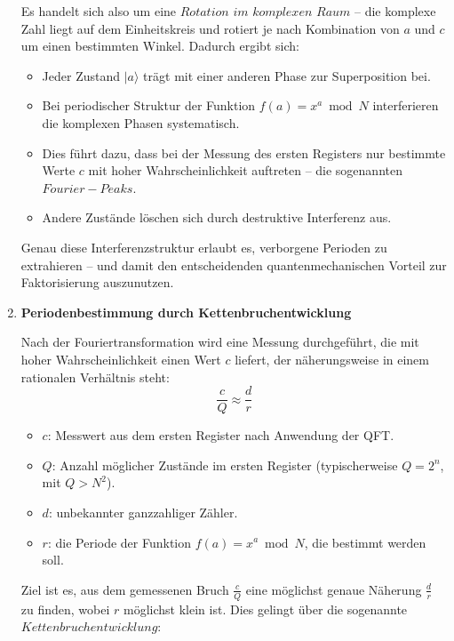 \begin{enumerate}
\noindent Es handelt sich also um eine \(Rotation\) \(im\) \(komplexen\) \(Raum\) – die komplexe Zahl liegt auf dem Einheitskreis und rotiert je nach Kombination von \( a \) und \( c \) um einen bestimmten Winkel. Dadurch ergibt sich:

\begin{itemize}
    \item Jeder Zustand \( |a\rangle \) trägt mit einer anderen Phase zur Superposition bei.
    \item Bei periodischer Struktur der Funktion \( f(a) = x^a \bmod N \) interferieren die komplexen Phasen systematisch.
    \item Dies führt dazu, dass bei der Messung des ersten Registers nur bestimmte Werte \( c \) mit hoher Wahrscheinlichkeit auftreten – die sogenannten \(Fourier-Peaks\).
    \item Andere Zustände löschen sich durch destruktive Interferenz aus.
\end{itemize}

\noindent Genau diese Interferenzstruktur erlaubt es, verborgene Perioden zu extrahieren – und damit den entscheidenden quantenmechanischen Vorteil zur Faktorisierung auszunutzen.\\

\item \textbf{Periodenbestimmung durch Kettenbruchentwicklung}

\noindent Nach der Fouriertransformation wird eine Messung durchgeführt, die mit hoher Wahrscheinlichkeit einen Wert \( c \) liefert, der näherungsweise in einem rationalen Verhältnis steht:
\[
\frac{c}{Q} \approx \frac{d}{r}
\]

\begin{itemize}
    \item \( c \): Messwert aus dem ersten Register nach Anwendung der QFT.
    \item \( Q \): Anzahl möglicher Zustände im ersten Register (typischerweise \( Q = 2^n \), mit \( Q > N^2 \)).
    \item \( d \): unbekannter ganzzahliger Zähler.
    \item \( r \): die Periode der Funktion \( f(a) = x^a \bmod N \), die bestimmt werden soll.
\end{itemize}

\noindent Ziel ist es, aus dem gemessenen Bruch \( \frac{c}{Q} \) eine möglichst genaue Näherung \( \frac{d}{r} \) zu finden, wobei \( r \) möglichst klein ist. Dies gelingt über die sogenannte \(Kettenbruchentwicklung\):


\end{enumerate}

